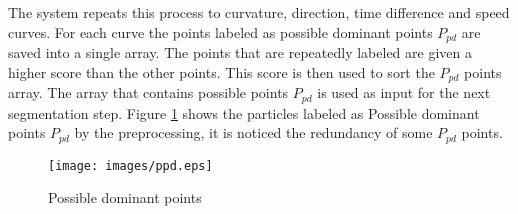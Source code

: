   
The system repeats this process to curvature, direction, time difference and speed curves. For each curve the points labeled as possible dominant points $P_{pd}$ are saved into a single array. The points that are repeatedly labeled are given a higher score than the other points. This score is then used to sort the  $P_{pd}$ points array. The array that contains possible points $P_{pd}$ is used as input for the next segmentation step. Figure \ref{fig:LabelsPPD} shows the particles labeled as Possible dominant points $P_{pd}$ by the preprocessing, it is noticed the redundancy of some $P_{pd}$ points. 


\begin{figure}
	\centering
		\texttt{[image: images/ppd.eps]}
	\caption{Possible dominant points}%
	\label{fig:LabelsPPD}
\end{figure}

